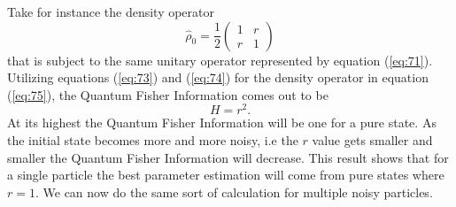 \documentclass[twocolumn]{article}
\begin{document}
Take for instance the density operator
\begin{equation} \label{eq:75}
\hat{\rho}_0=\frac{1}{2}
\begin{pmatrix}
1 & r \\
r & 1
\end{pmatrix}
\end{equation}
that is subject to the same unitary operator represented by equation (\ref{eq:71}).  Utilizing equations (\ref{eq:73}) and (\ref{eq:74}) for the density operator in equation (\ref{eq:75}), the Quantum Fisher Information comes out to be 
\begin{equation} \label{eq:76}
H=r^2.
\end{equation}
At its highest the Quantum Fisher Information will be one for a pure state. As the initial state becomes more and more noisy, i.e the $r$ value gets smaller and smaller the Quantum Fisher Information will decrease. This result shows that for a single particle the best parameter estimation will come from pure states where $r=1$. We can now do the same sort of calculation for multiple noisy particles. 
\end{document}
